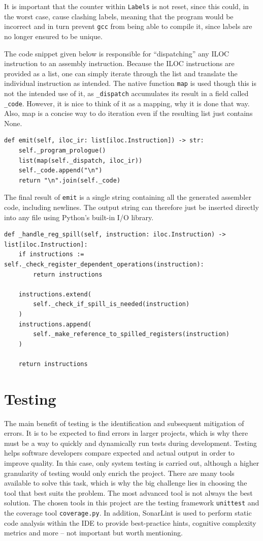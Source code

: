 It is important that the counter within \texttt{Labels} is not reset, since this could, in the worst case, cause clashing labels, meaning that the program would be incorrect and in turn prevent \texttt{gcc} from being able to compile it, since labels are no longer ensured to be unique.

The code snippet given below is responsible for ``dispatching'' any ILOC instruction to an assembly instruction. Because the ILOC instructions are provided as a list, one can simply iterate through the list and translate the individual instruction as intended. The native function \texttt{map} is used though this is not the intended use of it, as \texttt{\_dispatch} accumulates its result in a field called \texttt{\_code}. However, it is nice to think of it as a mapping, why it is done that way. Also, map is a concise way to do iteration even if the resulting list just contains None.

\begin{verbatim}
def emit(self, iloc_ir: list[iloc.Instruction]) -> str:
    self._program_prologue()
    list(map(self._dispatch, iloc_ir))
    self._code.append("\n")
    return "\n".join(self._code)
\end{verbatim}

The final result of \texttt{emit} is a single string containing all the generated assembler code, including newlines. The output string can therefore just be inserted directly into any file using Python's built-in I/O library.

\begin{verbatim}
def _handle_reg_spill(self, instruction: iloc.Instruction) -> list[iloc.Instruction]:
    if instructions := self._check_register_dependent_operations(instruction):
        return instructions

    instructions.extend(
        self._check_if_spill_is_needed(instruction)
    )
    instructions.append(
        self._make_reference_to_spilled_registers(instruction)
    )

    return instructions
\end{verbatim}

\chapter{Testing}
The main benefit of testing is the identification and subsequent mitigation of errors. It is to be expected to find errors in larger projects, which is why there must be a way to quickly and dynamically run tests during development. Testing helps software developers compare expected and actual output in order to improve quality. In this case, only system testing is carried out, although a higher granularity of testing would only enrich the project. There are many tools available to solve this task, which is why the big challenge lies in choosing the tool that best suits the problem. The most advanced tool is not always the best solution. The chosen tools in this project are the testing framework \texttt{unittest} and the coverage tool \texttt{coverage.py}. In addition, SonarLint is used to perform static code analysis within the IDE to provide best-practice hints, cognitive complexity metrics and more -- not important but worth mentioning.

